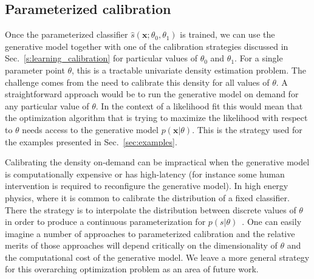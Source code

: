 \documentclass[12pt]{article}
\numberwithin{equation}{section}
\theoremstyle{plain}
\begin{document}
\subsection{Parameterized calibration}
\label{sec:param-calibration}



Once the parameterized classifier $\hat{s}(\mathbf{x}; \theta_0, \theta_1)$ is trained,
we can use the generative model together with one of the calibration strategies
discussed in Sec.~\ref{s:learning_calibration} for particular values of $\theta_0$ and $\theta_1$.
For a single parameter point $\theta$, this is a tractable univariate density
estimation problem. The challenge comes from the need to calibrate this density
for all values of $\theta$. A straightforward approach would be to run the
generative model on demand for any particular value of $\theta$. In the context
of a likelihood fit this would mean that the optimization algorithm that is
trying to maximize the likelihood with respect to $\theta$ needs access to the
generative model $p(\mathbf{x}|\theta)$.  This is the strategy used for the examples presented in Sec.~\ref{sec:examples}.

Calibrating the density on-demand can be  impractical when the generative
model is computationally expensive or has high-latency (for instance some human
intervention is required to reconfigure the generative model). In high energy physics, where
it is common to calibrate the distribution of a fixed classifier. There the strategy is to interpolate
the distribution between discrete values of $\theta$ in order to produce a continuous parameterization for
$p(s | \theta)$~\citep{read1999linear,Cranmer:2012sba,baak2015interpolation}.
One can easily imagine a number of approaches to parameterized calibration and the
relative merits of those approaches will depend critically on the dimensionality of $\theta$ and the
computational cost of the generative model. We leave a more general strategy for
this overarching optimization problem as an area of future work.

\end{document}
